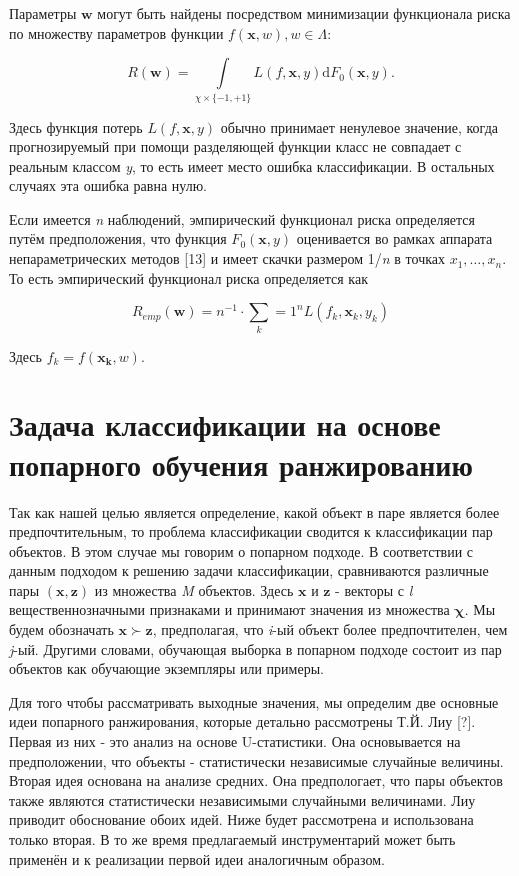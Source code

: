 \documentclass[12pt,a4paper,oneside]{article}
\begin{document}
\par
Параметры \(\mathbf{w}\) могут быть найдены посредством минимизации функционала риска по множеству параметров функции \(f(\mathbf{x}, w), w \in \Lambda\):

\[
R(\mathbf{w}) = \int \limits_{\chi \times \{-1, +1\}} L(f, \mathbf{x}, y) \mathrm{d} F_0(\mathbf{x}, y).
\]

Здесь функция потерь \(L(f, \mathbf{x}, y)\) обычно принимает ненулевое значение, когда прогнозируемый при помощи разделяющей функции класс не совпадает с реальным классом \emph{y}, то есть имеет место ошибка классификации. 
В остальных случаях эта ошибка равна нулю. 

\par
Если имеется \emph{n} наблюдений, эмпирический функционал риска определяется путём предположения, что функция \(F_0(\mathbf{x}, y)\) оценивается во рамках аппарата непараметрических методов [13] и имеет скачки размером 1/\emph{n} в точках \(x_1, \dots, x_n\). 
То есть эмпирический функционал риска определяется как

\[
R_{emp}(\mathbf{w}) = n^{-1} \cdot \sum \limits_k=1^n L(f_k, \mathbf{x}_k, y_k)
\]

Здесь \(f_k=f(\mathbf{x_k}, w)\). 

\section{Задача классификации на основе попарного обучения ранжированию}
\label{sec:pairwise_rank_learning_problem}

\par
Так как нашей целью является определение, какой объект в паре является более предпочтительным, то проблема классификации сводится к классификации пар объектов. 
В этом случае мы говорим о попарном подходе. 
В соответствии с данным подходом к решению задачи классификации, сравниваются различные пары \((\mathbf{x},\mathbf{z})\) из множества \emph{M} объектов. 
Здесь \(\mathbf{x}\) и \(\mathbf{z}\) - векторы с \emph{l} вещественнозначными признаками и принимают значения из множества \(\mathbf{\chi}\). 
Мы будем обозначать \(\mathbf{x} \succ \mathbf{z}\), предполагая, что \emph{i}-ый объект более предпочтителен, чем \emph{j}-ый. 
Другими словами, обучающая выборка в попарном подходе состоит из пар объектов как обучающие экземпляры или примеры. 

\par
Для того чтобы рассматривать выходные значения, мы определим две основные идеи попарного ранжирования, которые детально рассмотрены Т.Й. Лиу [?].
Первая из них - это анализ на основе U-статистики.
Она основывается на предположении, что объекты - статистически независимые случайные величины.
Вторая идея основана на анализе средних. 
Она предпологает, что пары объектов также являются статистически независимыми случайными величинами. 
Лиу приводит обоснование обоих идей. 
Ниже будет рассмотрена и использована только вторая. 
В то же время предлагаемый инструментарий может быть применён и к реализации первой идеи аналогичным образом. 
\end{document}
